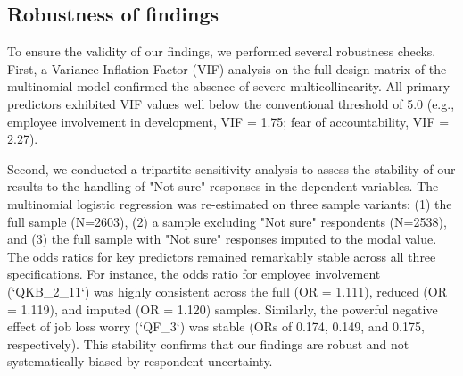 \documentclass[]{article}
\begin{document}
\subsection{Robustness of findings}
To ensure the validity of our findings, we performed several robustness checks. First, a Variance Inflation Factor (VIF) analysis on the full design matrix of the multinomial model confirmed the absence of severe multicollinearity. All primary predictors exhibited VIF values well below the conventional threshold of 5.0 (e.g., employee involvement in development, VIF = 1.75; fear of accountability, VIF = 2.27).

Second, we conducted a tripartite sensitivity analysis to assess the stability of our results to the handling of "Not sure" responses in the dependent variables. The multinomial logistic regression was re-estimated on three sample variants: (1) the full sample (N=2603), (2) a sample excluding "Not sure" respondents (N=2538), and (3) the full sample with "Not sure" responses imputed to the modal value. The odds ratios for key predictors remained remarkably stable across all three specifications. For instance, the odds ratio for employee involvement (`QKB_2_11`) was highly consistent across the full (OR = 1.111), reduced (OR = 1.119), and imputed (OR = 1.120) samples. Similarly, the powerful negative effect of job loss worry (`QF_3`) was stable (ORs of 0.174, 0.149, and 0.175, respectively). This stability confirms that our findings are robust and not systematically biased by respondent uncertainty.
\end{document}
